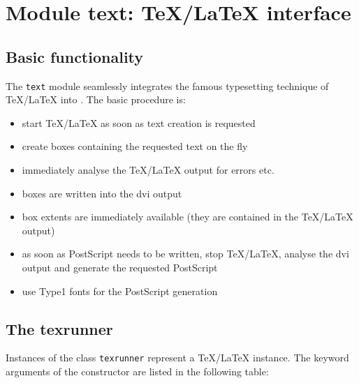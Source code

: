 \chapter{Module text: \TeX/\LaTeX{} interface}
\label{module:text}

\section{Basic functionality}

The \verb|text| module seamlessly integrates the famous typesetting
technique of \TeX/\LaTeX{} into \PyX. The basic procedure is:
\begin{itemize}
\item start \TeX/\LaTeX{} as soon as text creation is requested
\item create boxes containing the requested text on the fly
\item immediately analyse the \TeX/\LaTeX{} output for errors etc.
\item boxes are written into the dvi output
\item box extents are immediately available (they are contained in the
\TeX/\LaTeX{} output)
\item as soon as PostScript needs to be written, stop \TeX/\LaTeX{},
analyse the dvi output and generate the requested PostScript
\item use Type1 fonts for the PostScript generation
\end{itemize}

\section{The texrunner}
Instances of the class \verb|texrunner| represent a \TeX/\LaTeX{}
instance. The keyword arguments of the constructor are listed in the
following table:

